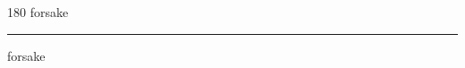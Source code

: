 
\begin{frame}
\begin{center}
\begin{turn}{180}
{\fontsize{2.5cm}{1em}\selectfont forsake}
\end{turn}
\vspace{1em}\par  
\hrule
\vspace{1em}\par  
{\fontsize{2.5cm}{1em}\selectfont forsake}
\end{center}
\end{frame}
